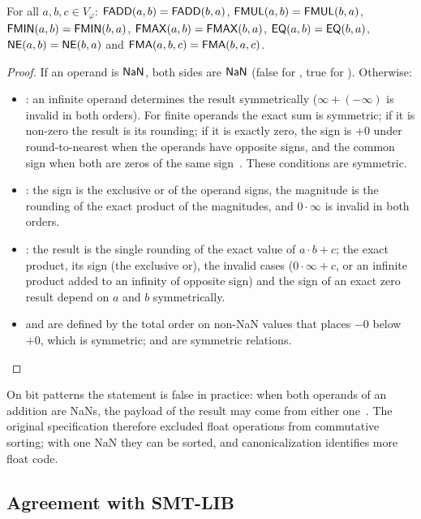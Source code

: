 \begin{theorem}\label{thm:float-comm}
For all $a,b,c\in V_\varphi$: $\mbox{\textsf{FADD}}(a,b)=\mbox{\textsf{FADD}}(b,a)$, $\mbox{\textsf{FMUL}}(a,b)=\mbox{\textsf{FMUL}}(b,a)$,
$\mbox{\textsf{FMIN}}(a,b)=\mbox{\textsf{FMIN}}(b,a)$, $\mbox{\textsf{FMAX}}(a,b)=\mbox{\textsf{FMAX}}(b,a)$, $\mbox{\textsf{EQ}}(a,b)=\mbox{\textsf{EQ}}(b,a)$,
$\mbox{\textsf{NE}}(a,b)=\mbox{\textsf{NE}}(b,a)$ and $\mbox{\textsf{FMA}}(a,b,c)=\mbox{\textsf{FMA}}(b,a,c)$.
\end{theorem}
\begin{proof}
If an operand is $\mathsf{NaN}$, both sides are $\mathsf{NaN}$ (false for , true for ). Otherwise:
\begin{itemize}
\item {}: an infinite operand determines the result symmetrically ($\infty+(-\infty)$ is
  invalid in both orders). For finite operands the exact sum is symmetric; if it is non-zero the
  result is its rounding; if it is exactly zero, the sign is $+0$ under round-to-nearest when
  the operands have opposite signs, and the common sign when both are zeros of the same
  sign~\cite{ieee754-2019}. These conditions are symmetric.
\item {}: the sign is the exclusive or of the operand signs, the magnitude is the
  rounding of the exact product of the magnitudes, and $0\cdot\infty$ is invalid in both
  orders.
\item {}: the result is the single rounding of the exact value of $a\cdot b+c$; the
  exact product, its sign (the exclusive or), the invalid cases ($0\cdot\infty+c$, or an
  infinite product added to an infinity of opposite sign) and the sign of an exact zero result
  depend on $a$ and $b$ symmetrically.
\item {} and  are defined by the total order on non-NaN values that places
  $-0$ below $+0$, which is symmetric;  and  are symmetric relations. \qedhere
\end{itemize}
\end{proof}

On bit patterns the statement is false in practice: when both operands of an addition are
NaNs, the payload of the result may come from either one~\cite{llvm-langref}. The original
specification therefore excluded float operations from commutative sorting; with one NaN
they can be sorted, and canonicalization identifies more float code.

\subsection{Agreement with SMT-LIB}

